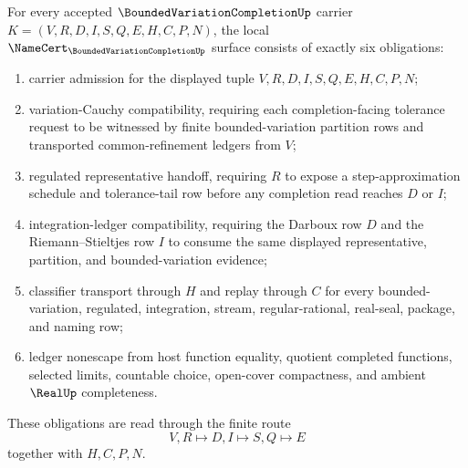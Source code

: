 
\begin{theorem}
\label{thm:bounded-variation-completion-namecert-obligations}
For every accepted $\BoundedVariationCompletionUp$ carrier $K=(V,R,D,I,S,Q,E,H,C,P,N)$, the local $\NameCert_{\BoundedVariationCompletionUp}$ surface consists of exactly six obligations:
\begin{enumerate}
\item carrier admission for the displayed tuple $V,R,D,I,S,Q,E,H,C,P,N$;
\item variation-Cauchy compatibility, requiring each completion-facing tolerance request to be witnessed by finite bounded-variation partition rows and transported common-refinement ledgers from $V$;
\item regulated representative handoff, requiring $R$ to expose a step-approximation schedule and tolerance-tail row before any completion read reaches $D$ or $I$;
\item integration-ledger compatibility, requiring the Darboux row $D$ and the Riemann--Stieltjes row $I$ to consume the same displayed representative, partition, and bounded-variation evidence;
\item classifier transport through $H$ and replay through $C$ for every bounded-variation, regulated, integration, stream, regular-rational, real-seal, package, and naming row;
\item ledger nonescape from host function equality, quotient completed functions, selected limits, countable choice, open-cover compactness, and ambient $\RealUp$ completeness.
\end{enumerate}
These obligations are read through the finite route
$$
V,R \longmapsto D,I \longmapsto S,Q \longmapsto E
$$
together with $H,C,P,N$.
\end{theorem}
